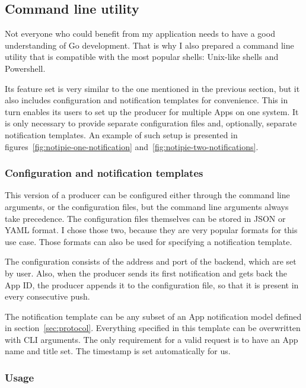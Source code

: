 \subsection{Command line utility}\label{sec:command-line-utility}

Not everyone who could benefit
from my application
needs to have a good understanding
of Go development.
That is why I also prepared
a command line utility
that is compatible with the most popular shells:
Unix-like shells and Powershell.

Its feature set is very similar
to the one mentioned in the previous section,
but it also includes configuration
and notification templates
for convenience.
This in turn enables its users
to set up the producer for multiple Apps
on one system.
It is only necessary to provide
separate configuration files
and, optionally, separate notification templates.
An example of such setup is presented
in figures~\ref{fig:notipie-one-notification}
and~\ref{fig:notipie-two-notifications}.

\subsubsection{Configuration and notification templates}\label{sec:configuration-and-notification-templates}

This version of a producer can be configured
either through the command line arguments,
or the configuration files,
but the command line arguments
always take precedence.
The configuration files themselves
can be stored in \ac{JSON} or \ac{YAML} format.
I chose those two,
because they are very popular formats
for this use case.
Those formats can also be used
for specifying a notification template.

The configuration consists of
the address and port of the backend,
which are set by user.
Also, when the producer sends its first notification
and gets back the App \ac{ID},
the producer appends it to the configuration file,
so that it is present in every consecutive push.

The notification template can be any
subset of an App notification model
defined in section~\ref{sec:protocol}.
Everything specified in this template
can be overwritten with \ac{CLI} arguments.
The only requirement for a valid request
is to have an App name and title set.
The timestamp is set automatically for us.

\subsubsection{Usage}\label{sec:producer-usage}

